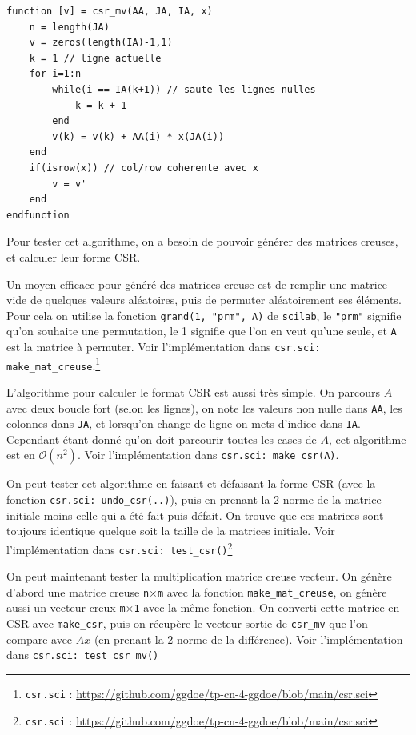\documentclass{article}
\begin{document}
\begin{scriptsize}
\centering
\begin{verbatim}
function [v] = csr_mv(AA, JA, IA, x)
    n = length(JA)
    v = zeros(length(IA)-1,1)
    k = 1 // ligne actuelle
    for i=1:n
        while(i == IA(k+1)) // saute les lignes nulles
            k = k + 1
        end
        v(k) = v(k) + AA(i) * x(JA(i))
    end
    if(isrow(x)) // col/row coherente avec x
        v = v'
    end
endfunction
\end{verbatim}
\end{scriptsize}

Pour tester cet algorithme, on a besoin de pouvoir générer des matrices creuses, et calculer leur forme CSR.

Un moyen efficace pour généré des matrices creuse est de remplir une matrice vide de quelques valeurs aléatoires, puis de permuter aléatoirement ses éléments. Pour cela on utilise la fonction \texttt{grand(1, "prm", A)} de \texttt{scilab}, le \texttt{"prm"} signifie qu'on souhaite une permutation, le 1 signifie que l'on en veut qu'une seule, et \texttt{A} est la matrice à permuter. Voir l'implémentation dans \texttt{csr.sci: make\_mat\_creuse}.\footnote{\texttt{csr.sci} : \href{https://github.com/ggdoe/tp-cn-4-ggdoe/blob/main/csr.sci}{https://github.com/ggdoe/tp-cn-4-ggdoe/blob/main/csr.sci}}
\newline\indent

L'algorithme pour calculer le format CSR est aussi très simple. On parcours \(A\) avec deux boucle fort (selon les lignes), on note les valeurs non nulle dans \texttt{AA}, les colonnes dans \texttt{JA}, et lorsqu'on change de ligne on mets d'indice dans \texttt{IA}. Cependant étant donné qu'on doit parcourir toutes les cases de \(A\), cet algorithme est en \(\mathcal{O}(n^2)\). Voir l'implémentation dans \texttt{csr.sci: make\_csr(A)}.

On peut tester cet algorithme en faisant et défaisant la forme CSR (avec la fonction \texttt{csr.sci: undo\_csr(..)}), puis en prenant la 2-norme de la matrice initiale moins celle qui a été fait puis défait. On trouve que ces matrices sont toujours identique quelque soit la taille de la matrices initiale. Voir l'implémentation dans \texttt{csr.sci: test\_csr()}\footnote{\texttt{csr.sci} : \href{https://github.com/ggdoe/tp-cn-4-ggdoe/blob/main/csr.sci}{https://github.com/ggdoe/tp-cn-4-ggdoe/blob/main/csr.sci}}
\newline\indent

On peut maintenant tester la multiplication matrice creuse vecteur. On génère d'abord une matrice creuse \texttt{n}\(\times\)\texttt{m} avec la fonction \texttt{make\_mat\_creuse}, on génère aussi un vecteur creux \texttt{m}\(\times\)\texttt{1} avec la même fonction. On converti cette matrice en CSR avec \texttt{make\_csr}, puis on récupère le vecteur sortie de \texttt{csr\_mv} que l'on compare avec \(Ax\) (en prenant la 2-norme de la différence). Voir l'implémentation dans \texttt{csr.sci: test\_csr\_mv()}
\end{document}
